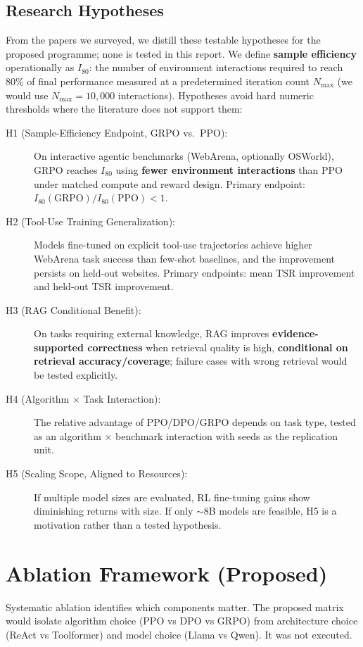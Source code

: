 \documentclass[12pt,a4paper]{report}
\theoremstyle{definition}
\begin{document}
\subsection{Research Hypotheses}
From the papers we surveyed, we distill these testable hypotheses for the proposed programme; none is tested in this report. We define \textbf{sample efficiency} operationally as $I_{80}$: the number of environment interactions required to reach 80\% of final performance measured at a predetermined iteration count $N_{\max}$ (we would use $N_{\max} = 10{,}000$ interactions). Hypotheses avoid hard numeric thresholds where the literature does not support them:

\begin{description}
    \item[H1 (Sample-Efficiency Endpoint, GRPO vs.\ PPO):] On interactive agentic benchmarks (WebArena, optionally OSWorld), GRPO reaches $I_{80}$ using \textbf{fewer environment interactions} than PPO under matched compute and reward design. Primary endpoint: $I_{80}(\text{GRPO}) / I_{80}(\text{PPO}) < 1$.

    \item[H2 (Tool-Use Training Generalization):] Models fine-tuned on explicit tool-use trajectories achieve higher WebArena task success than few-shot baselines, and the improvement persists on held-out websites. Primary endpoints: mean TSR improvement and held-out TSR improvement.

    \item[H3 (RAG Conditional Benefit):] On tasks requiring external knowledge, RAG improves \textbf{evidence-supported correctness} when retrieval quality is high, \textbf{conditional on retrieval accuracy/coverage}; failure cases with wrong retrieval would be tested explicitly.

    \item[H4 (Algorithm $\times$ Task Interaction):] The relative advantage of PPO/DPO/GRPO depends on task type, tested as an algorithm $\times$ benchmark interaction with seeds as the replication unit.

    \item[H5 (Scaling Scope, Aligned to Resources):] If multiple model sizes are evaluated, RL fine-tuning gains show diminishing returns with size. If only $\sim$8B models are feasible, H5 is a motivation rather than a tested hypothesis.
\end{description}

\section{Ablation Framework (Proposed)}
Systematic ablation identifies which components matter. The proposed matrix would isolate algorithm choice (PPO vs DPO vs GRPO) from architecture choice (ReAct vs Toolformer) and model choice (Llama vs Qwen). It was not executed.
\end{document}
